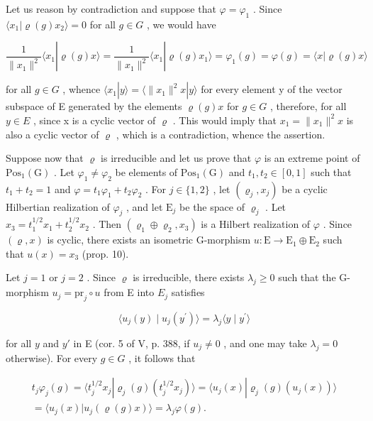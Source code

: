 Let us reason by contradiction and suppose that \(\varphi = \varphi_1\) . Since \(\langle x_1 | \varrho(g)x_2 \rangle = 0\) for all \(g \in G\) , we would have

\[
\frac {1}{\| x _ {1} \| ^ {2}} \langle x _ {1} | \varrho (g) x \rangle = \frac {1}{\| x _ {1} \| ^ {2}} \langle x _ {1} | \varrho (g) x _ {1} \rangle = \varphi_ {1} (g) = \varphi (g) = \langle x | \varrho (g) x \rangle
\]

for all \(g \in G\) , whence \(\langle x_{1} | y \rangle = \langle \|x_{1}\|^{2}x | y \rangle\) for every element y of the vector subspace of E generated by the elements \(\varrho(g)x\) for \(g \in G\) , therefore, for all \(y \in E\) , since x is a cyclic vector of \(\varrho\) . This would imply that \(x_{1} = \|x_{1}\|^{2}x\) is also a cyclic vector of \(\varrho\) , which is a contradiction, whence the assertion.

Suppose now that \(\varrho\) is irreducible and let us prove that \(\varphi\) is an extreme point of \(\mathrm{Pos}_1(\mathrm{G})\) . Let \(\varphi_1 \neq \varphi_2\) be elements of \(\mathrm{Pos}_1(\mathrm{G})\) and \(t_1, t_2 \in [0,1]\) such that \(t_1 + t_2 = 1\) and \(\varphi = t_1\varphi_1 + t_2\varphi_2\) . For \(j \in \{1,2\}\) , let \((\varrho_j, x_j)\) be a cyclic Hilbertian realization of \(\varphi_j\) , and let \(\mathrm{E}_j\) be the space of \(\varrho_j\) . Let \(x_3 = t_1^{1/2}x_1 + t_2^{1/2}x_2\) . Then \((\varrho_1 \oplus \varrho_2, x_3)\) is a Hilbert realization of \(\varphi\) . Since \((\varrho, x)\) is cyclic, there exists an isometric G-morphism \(u: \mathrm{E} \to \mathrm{E}_1 \oplus \mathrm{E}_2\) such that \(u(x) = x_3\) (prop. 10).

Let \(j = 1\) or \(j = 2\) . Since \(\varrho\) is irreducible, there exists \(\lambda_j \geqslant 0\) such that the G-morphism \(u_j = \mathrm{pr}_j \circ u\) from E into \(E_j\) satisfies

\[
\langle u _ {j} (y) \mid u _ {j} (y ^ {\prime}) \rangle = \lambda_ {j} \langle y \mid y ^ {\prime} \rangle
\]

for all \(y\) and \(y'\) in E (cor. 5 of V, p. 388, if \(u_j \neq 0\) , and one may take \(\lambda_j = 0\) otherwise). For every \(g \in G\) , it follows that

\[
\begin{array}{r} t _ {j} \varphi_ {j} (g) = \langle t _ {j} ^ {1 / 2} x _ {j} | \varrho_ {j} (g) (t _ {j} ^ {1 / 2} x _ {j}) \rangle = \langle u _ {j} (x) | \varrho_ {j} (g) (u _ {j} (x)) \rangle \\ = \langle u _ {j} (x) | u _ {j} (\varrho (g) x) \rangle = \lambda_ {j} \varphi (g). \end{array}
\]

